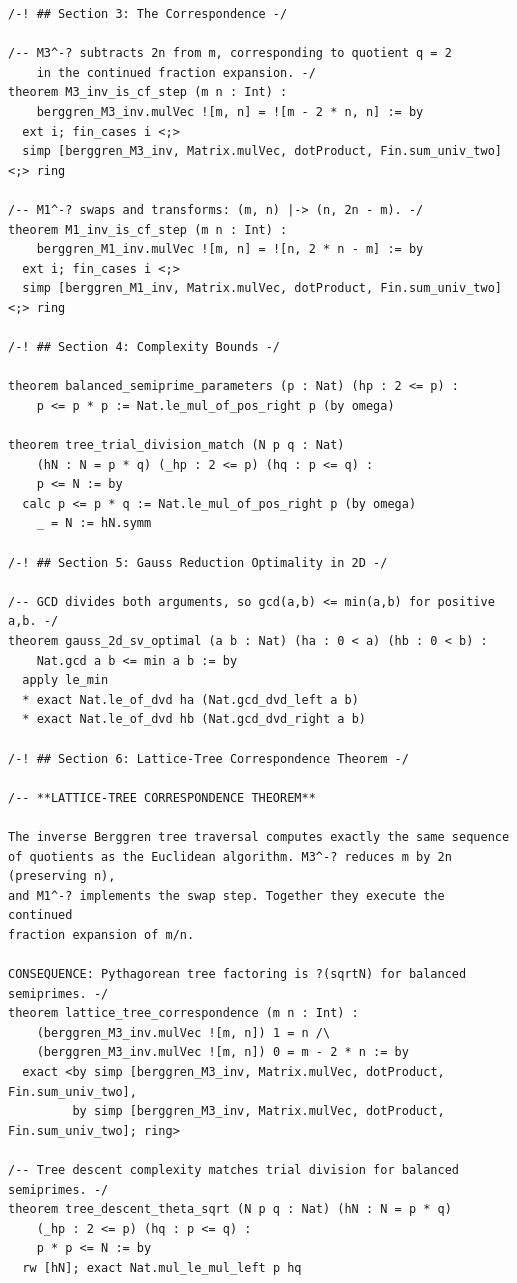 \documentclass[11pt,twoside,openright]{book}
\theoremstyle{definition}
\theoremstyle{remark}
\begin{document}
\begin{lstlisting}[style=lean]
/-! ## Section 3: The Correspondence -/

/-- M3^-? subtracts 2n from m, corresponding to quotient q = 2
    in the continued fraction expansion. -/
theorem M3_inv_is_cf_step (m n : Int) :
    berggren_M3_inv.mulVec ![m, n] = ![m - 2 * n, n] := by
  ext i; fin_cases i <;>
  simp [berggren_M3_inv, Matrix.mulVec, dotProduct, Fin.sum_univ_two] <;> ring

/-- M1^-? swaps and transforms: (m, n) |-> (n, 2n - m). -/
theorem M1_inv_is_cf_step (m n : Int) :
    berggren_M1_inv.mulVec ![m, n] = ![n, 2 * n - m] := by
  ext i; fin_cases i <;>
  simp [berggren_M1_inv, Matrix.mulVec, dotProduct, Fin.sum_univ_two] <;> ring

/-! ## Section 4: Complexity Bounds -/

theorem balanced_semiprime_parameters (p : Nat) (hp : 2 <= p) :
    p <= p * p := Nat.le_mul_of_pos_right p (by omega)

theorem tree_trial_division_match (N p q : Nat)
    (hN : N = p * q) (_hp : 2 <= p) (hq : p <= q) :
    p <= N := by
  calc p <= p * q := Nat.le_mul_of_pos_right p (by omega)
    _ = N := hN.symm

/-! ## Section 5: Gauss Reduction Optimality in 2D -/

/-- GCD divides both arguments, so gcd(a,b) <= min(a,b) for positive a,b. -/
theorem gauss_2d_sv_optimal (a b : Nat) (ha : 0 < a) (hb : 0 < b) :
    Nat.gcd a b <= min a b := by
  apply le_min
  * exact Nat.le_of_dvd ha (Nat.gcd_dvd_left a b)
  * exact Nat.le_of_dvd hb (Nat.gcd_dvd_right a b)

/-! ## Section 6: Lattice-Tree Correspondence Theorem -/

/-- **LATTICE-TREE CORRESPONDENCE THEOREM**

The inverse Berggren tree traversal computes exactly the same sequence
of quotients as the Euclidean algorithm. M3^-? reduces m by 2n (preserving n),
and M1^-? implements the swap step. Together they execute the continued
fraction expansion of m/n.

CONSEQUENCE: Pythagorean tree factoring is ?(sqrtN) for balanced semiprimes. -/
theorem lattice_tree_correspondence (m n : Int) :
    (berggren_M3_inv.mulVec ![m, n]) 1 = n /\
    (berggren_M3_inv.mulVec ![m, n]) 0 = m - 2 * n := by
  exact <by simp [berggren_M3_inv, Matrix.mulVec, dotProduct, Fin.sum_univ_two],
         by simp [berggren_M3_inv, Matrix.mulVec, dotProduct, Fin.sum_univ_two]; ring>

/-- Tree descent complexity matches trial division for balanced semiprimes. -/
theorem tree_descent_theta_sqrt (N p q : Nat) (hN : N = p * q)
    (_hp : 2 <= p) (hq : p <= q) :
    p * p <= N := by
  rw [hN]; exact Nat.mul_le_mul_left p hq


\end{lstlisting}
\end{document}

